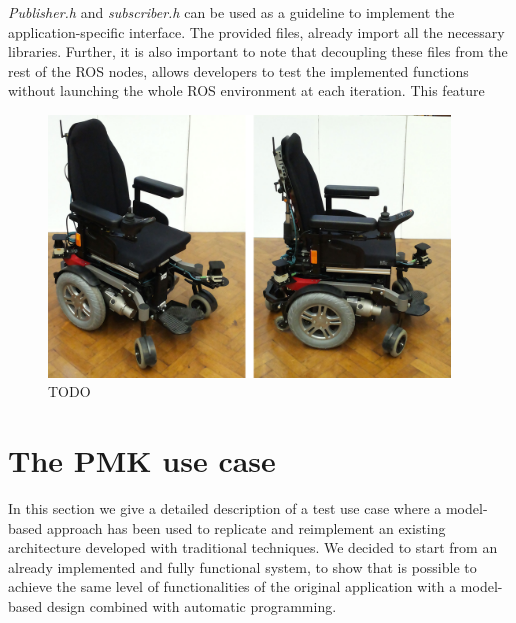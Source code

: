 


\textit{Publisher.h} and \textit{subscriber.h} can be used as a guideline to implement the application-specific interface. The provided files, already import all the necessary libraries. Further, it is also important to note that decoupling these files from the rest of the ROS nodes, allows developers to test the implemented functions without launching the whole ROS environment at each iteration. This feature 


\begin{figure}[t]
\centering
\includegraphics[width=0.95\textwidth]{gfx/pmk/pmk_plat}
\caption{TODO}
\label{fig:pmk}
\end{figure}


\section{The PMK use case}
\label{sec:pmk}
In this section we give a detailed description of a test use case where a model-based approach has been used to replicate and reimplement an existing architecture developed with traditional techniques. We decided to start from an already implemented and fully functional system, to show that is possible to achieve the same level of functionalities of the original application with a model-based design combined with automatic programming.

